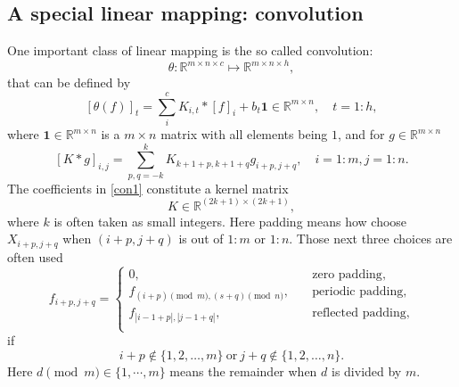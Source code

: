 \subsection{A special linear mapping: convolution}
One important class of linear mapping is the so called convolution:
$$
\theta: \mathbb{R}^{m\times n\times c} \mapsto \mathbb{R}^{m\times n \times h},
$$
that can be defined by 
\begin{equation}\label{conv-1}
[\theta(f)]_{t} = \sum_i^{c}K_{i,t} \ast [f]_i + b_t 
\bm{1}  \in \mathbb{R}^{m\times n}, \quad t = 1:h,
\end{equation}
where $\bm{1}  \in \mathbb{R}^{m\times n} $ is a 
$m\times n$ matrix with all elements being $1$,
and for $g \in \mathbb{R}^{m\times n}$
\begin{equation}\label{con1}
[K \ast g]_{i,j} = \sum_{p,q=-k}^k K_{k+1+p,k+1+q} g_{i + p, j + q}, \quad i=1:m, j = 1:n.
\end{equation}
The coefficients in \eqref{con1} constitute  a kernel matrix
\begin{equation}
K \in \mathbb{R}^{(2k+1) \times (2k+1)},
\end{equation}
where $k$ is often taken as small integers. 
Here padding means how choose $ X_{i+ p, j + q}$ 
when $(i+ p, j + q)$ is out of $1:m$ or $1:n$. 
Those next three choices are often used
\begin{equation}\label{eq:padding}
f_{i + p, j + q} = \begin{cases}
0,  \quad &\text{zero padding}, \\
f_{(i + p)\pmod{m}, (s + q)\pmod{n}},  \quad &\text{periodic padding}, \\
f_{|i-1 +p|, |j -1  +q|},  \quad &\text{reflected padding}, \\
\end{cases}
\end{equation}
if 
\begin{equation}
i + p \notin \{1, 2, \dots, m\} ~\text{or} ~  j+ q \notin \{1, 2, \dots, n\}.
\end{equation}
Here $ d \pmod m \in \{1, \cdots, m\} $  means the remainder when $d$ is divided by $m$.



